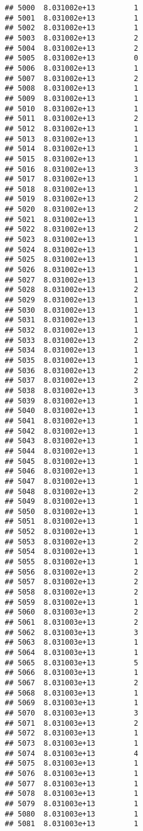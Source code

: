 \documentclass[
]{article}
\begin{document}
\begin{verbatim}
## 5000  8.031002e+13         1
## 5001  8.031002e+13         1
## 5002  8.031002e+13         1
## 5003  8.031002e+13         2
## 5004  8.031002e+13         2
## 5005  8.031002e+13         0
## 5006  8.031002e+13         1
## 5007  8.031002e+13         2
## 5008  8.031002e+13         1
## 5009  8.031002e+13         1
## 5010  8.031002e+13         1
## 5011  8.031002e+13         2
## 5012  8.031002e+13         1
## 5013  8.031002e+13         1
## 5014  8.031002e+13         1
## 5015  8.031002e+13         1
## 5016  8.031002e+13         3
## 5017  8.031002e+13         1
## 5018  8.031002e+13         1
## 5019  8.031002e+13         2
## 5020  8.031002e+13         2
## 5021  8.031002e+13         1
## 5022  8.031002e+13         2
## 5023  8.031002e+13         1
## 5024  8.031002e+13         1
## 5025  8.031002e+13         1
## 5026  8.031002e+13         1
## 5027  8.031002e+13         1
## 5028  8.031002e+13         2
## 5029  8.031002e+13         1
## 5030  8.031002e+13         1
## 5031  8.031002e+13         1
## 5032  8.031002e+13         1
## 5033  8.031002e+13         2
## 5034  8.031002e+13         1
## 5035  8.031002e+13         1
## 5036  8.031002e+13         2
## 5037  8.031002e+13         2
## 5038  8.031002e+13         3
## 5039  8.031002e+13         1
## 5040  8.031002e+13         1
## 5041  8.031002e+13         1
## 5042  8.031002e+13         1
## 5043  8.031002e+13         1
## 5044  8.031002e+13         1
## 5045  8.031002e+13         1
## 5046  8.031002e+13         1
## 5047  8.031002e+13         1
## 5048  8.031002e+13         2
## 5049  8.031002e+13         1
## 5050  8.031002e+13         1
## 5051  8.031002e+13         1
## 5052  8.031002e+13         1
## 5053  8.031002e+13         2
## 5054  8.031002e+13         1
## 5055  8.031002e+13         1
## 5056  8.031002e+13         2
## 5057  8.031002e+13         2
## 5058  8.031002e+13         2
## 5059  8.031002e+13         1
## 5060  8.031003e+13         2
## 5061  8.031003e+13         2
## 5062  8.031003e+13         3
## 5063  8.031003e+13         1
## 5064  8.031003e+13         1
## 5065  8.031003e+13         5
## 5066  8.031003e+13         1
## 5067  8.031003e+13         2
## 5068  8.031003e+13         1
## 5069  8.031003e+13         1
## 5070  8.031003e+13         3
## 5071  8.031003e+13         2
## 5072  8.031003e+13         1
## 5073  8.031003e+13         1
## 5074  8.031003e+13         4
## 5075  8.031003e+13         1
## 5076  8.031003e+13         1
## 5077  8.031003e+13         1
## 5078  8.031003e+13         1
## 5079  8.031003e+13         1
## 5080  8.031003e+13         1
## 5081  8.031003e+13         1

\end{verbatim}
\end{document}
